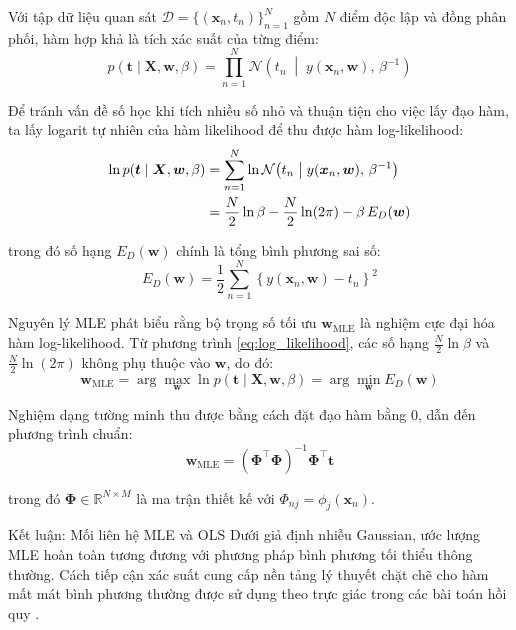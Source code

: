 Với tập dữ liệu quan sát $\mathcal{D} = \{(\boldsymbol{x}_n, t_n)\}_{n=1}^{N}$ 
gồm $N$ điểm độc lập và đồng phân phối, hàm hợp khả
là tích xác suất của từng điểm:
$$p(\boldsymbol{t} \mid \boldsymbol{X}, \boldsymbol{w}, \beta) 
  = \prod_{n=1}^{N} \mathcal{N}\!\left(t_n \;\middle|\; 
  y(\boldsymbol{x}_n, \boldsymbol{w}),\, \beta^{-1}\right)$$

Để tránh vấn đề số học khi tích nhiều số nhỏ và thuận tiện 
cho việc lấy đạo hàm, ta lấy logarit tự nhiên của hàm likelihood để thu được 
hàm log-likelihood:
\begin{align}
\ln p(\boldsymbol{t} \mid \boldsymbol{X}, \boldsymbol{w}, \beta) 
&= \sum_{n=1}^{N} \ln \mathcal{N}\!\left(t_n \;\middle|\; 
   y(\boldsymbol{x}_n, \boldsymbol{w}),\, \beta^{-1}\right) \notag \\
&= \frac{N}{2}\ln\beta - \frac{N}{2}\ln(2\pi) 
   - \beta\, E_D(\boldsymbol{w})
\label{eq:log_likelihood}
\end{align}

trong đó số hạng $E_D(\boldsymbol{w})$ chính là tổng bình phương sai số:
$$E_D(\boldsymbol{w}) = \frac{1}{2}\sum_{n=1}^{N} 
  \left\{y(\boldsymbol{x}_n, \boldsymbol{w}) - t_n\right\}^2$$

Nguyên lý MLE phát biểu rằng bộ trọng số tối ưu $\boldsymbol{w}_{\mathrm{MLE}}$ 
là nghiệm cực đại hóa hàm log-likelihood. Từ phương trình \eqref{eq:log_likelihood}, 
các số hạng $\frac{N}{2}\ln\beta$ và $\frac{N}{2}\ln(2\pi)$ không phụ thuộc vào 
$\boldsymbol{w}$, do đó:
$$\boldsymbol{w}_{\mathrm{MLE}} 
  = \arg\max_{\boldsymbol{w}} \ln p(\boldsymbol{t} \mid \boldsymbol{X}, 
    \boldsymbol{w}, \beta)
  = \arg\min_{\boldsymbol{w}} E_D(\boldsymbol{w})$$

Nghiệm dạng tường minh thu được bằng cách đặt đạo hàm 
bằng 0, dẫn đến phương trình chuẩn:
$$\boldsymbol{w}_{\mathrm{MLE}} = \left(\boldsymbol{\Phi}^{\top}\boldsymbol{\Phi}\right)^{-1}
  \boldsymbol{\Phi}^{\top}\boldsymbol{t}$$

trong đó $\boldsymbol{\Phi} \in \mathbb{R}^{N \times M}$ là ma trận thiết kế  với $\Phi_{nj} = \phi_j(\boldsymbol{x}_n)$.

\begin{importantbox}{Kết luận: Mối liên hệ MLE và OLS}
Dưới giả định nhiễu Gaussian, ước lượng MLE hoàn toàn tương 
đương với phương pháp bình phương tối thiểu thông thường. Cách tiếp cận xác suất cung cấp nền tảng lý thuyết chặt chẽ 
cho hàm mất mát bình phương thường được sử dụng theo trực giác trong các bài toán 
hồi quy \cite{bishop2006pattern}.
\end{importantbox}

